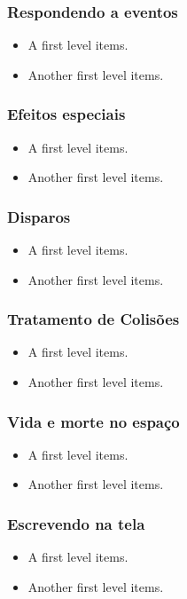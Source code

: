 \begin{frame}
    \frametitle{Respondendo a eventos}

    \begin{itemize}
        \item A first level items.
        \item Another first level items.
    \end{itemize}
\end{frame}

\begin{frame}
    \frametitle{Efeitos especiais}

    \begin{itemize}
        \item A first level items.
        \item Another first level items.
    \end{itemize}
\end{frame}

\begin{frame}
    \frametitle{Disparos}

    \begin{itemize}
        \item A first level items.
        \item Another first level items.
    \end{itemize}
\end{frame}

\begin{frame}
    \frametitle{Tratamento de Colisões}

    \begin{itemize}
        \item A first level items.
        \item Another first level items.
    \end{itemize}
\end{frame}

\begin{frame}
    \frametitle{Vida e morte no espaço}

    \begin{itemize}
        \item A first level items.
        \item Another first level items.
    \end{itemize}
\end{frame}

\begin{frame}
    \frametitle{Escrevendo na tela}

    \begin{itemize}
        \item A first level items.
        \item Another first level items.
    \end{itemize}
\end{frame}

